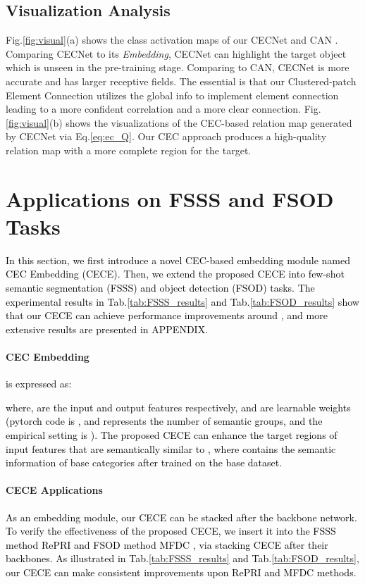 \documentclass{article}
\newcommand{\jinxiang}[1]{\textcolor{black}{#1}}
\begin{document}
\subsection{Visualization Analysis}
Fig.\ref{fig:visual}(a) shows the class activation maps \cite{zhou2016learning} of our CECNet and CAN \cite{hou2019cross}. Comparing CECNet to its \textit{Embedding}, CECNet can highlight the target object which is unseen in the pre-training stage.
Comparing to CAN, CECNet is more accurate and has larger receptive fields. The essential is that our Clustered-patch Element Connection utilizes the global info to implement element connection leading to a more confident correlation and a more clear connection.
Fig.\ref{fig:visual}(b) shows the visualizations of the CEC-based relation map  generated by CECNet via Eq.\ref{eq:ec_Q}. Our CEC approach produces a high-quality relation map with a more complete region for the target.


\section{Applications on FSSS and FSOD Tasks}
\jinxiang{In this section, we first introduce a novel CEC-based embedding module named CEC Embedding (CECE). Then, we extend the proposed CECE into few-shot semantic segmentation (FSSS) and object detection (FSOD) tasks. The experimental results in Tab.\ref{tab:FSSS_results} and Tab.\ref{tab:FSOD_results} show that our CECE can achieve performance improvements around , and more extensive results are presented in APPENDIX.}

\paragraph{CEC Embedding}
\jinxiang{ is expressed as:

where,  are the input and output features respectively, and  are learnable weights (pytorch code is , and  represents the number of semantic groups, and the empirical setting is ).
The proposed CECE can enhance the target regions of input features that are semantically similar to , where  contains the semantic information of base categories after trained on the base dataset.}

\paragraph{CECE Applications}
\jinxiang{As an embedding module, our CECE can be stacked after the backbone network.
To verify the effectiveness of the proposed CECE, we insert it into the FSSS method RePRI \cite{Malik2021repri} and FSOD method MFDC \cite{wu2022multi}, via stacking CECE after their backbones.
As illustrated in Tab.\ref{tab:FSSS_results} and Tab.\ref{tab:FSOD_results}, our CECE can make consistent improvements upon RePRI and MFDC methods.}
\end{document}

